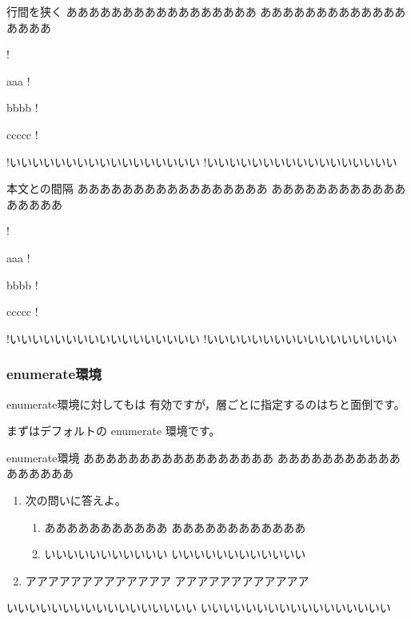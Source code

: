 \documentclass[fleqn,a4j]{jarticle}
\begin{document}
\begin{showpEx}{行間を狭く}
あああああああああああああああああ
あああああああああああああああああ
\apnlist{\narrowsep}
\begin{description}
! \item [AAA] aaa
! \item [BB] bbbb
! \item [C] ccccc
!\end{description}
!いいいいいいいいいいいいいいいいい
!いいいいいいいいいいいいいいいいい
\end{showpEx}

\begin{showpEx}{本文との間隔}
あああああああああああああああああ
あああああああああああああああああ
\apnlist{\narrowsep\topsep=0pt}
\begin{description}
! \item [AAA] aaa
! \item [BB] bbbb
! \item [C] ccccc
!\end{description}
!いいいいいいいいいいいいいいいいい
!いいいいいいいいいいいいいいいいい
\end{showpEx}

\subsubsection{\textsf{enumerate}環境}
\textsf{enumerate}環境に対してもは
有効ですが，層ごとに指定するのはちと面倒です。

まずはデフォルトの \textsf{enumerate} 環境です。

\begin{showEx}{\textsf{enumerate}環境}
あああああああああああああああああ
あああああああああああああああああ
\begin{enumerate}[1.~]
  \item 次の問いに答えよ。
    \begin{enumerate}[(1)]
      \item あああああああああああ
        ああああああああああああ
      \item いいいいいいいいいいい
        いいいいいいいいいいいい
    \end{enumerate}
  \item アアアアアアアアアアアアア
    アアアアアアアアアアアア
\end{enumerate}
いいいいいいいいいいいいいいいいい
いいいいいいいいいいいいいいいいい
\end{showEx}
\end{document}
